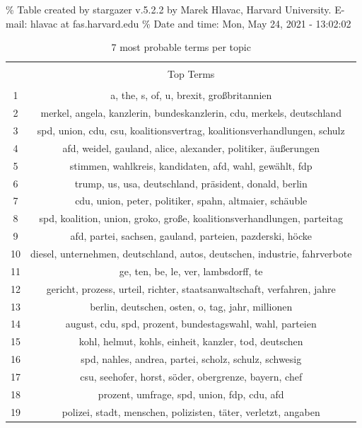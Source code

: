 \documentclass[
]{article}
\begin{document}
\% Table created by stargazer v.5.2.2 by Marek Hlavac, Harvard
University. E-mail: hlavac at fas.harvard.edu \% Date and time: Mon, May
24, 2021 - 13:02:02

\begin{table}[!htbp] \centering 
  \caption{7 most probable terms per topic} 
  \label{table:top_terms} 
\begin{tabular}{@{\extracolsep{5pt}} cc} 
\\[-1.8ex]\hline 
\hline \\[-1.8ex] 
 & Top Terms \\ 
\hline \\[-1.8ex] 
1 & a, the, s, of, u, brexit, großbritannien \\ 
2 & merkel, angela, kanzlerin, bundeskanzlerin, cdu, merkels, deutschland \\ 
3 & spd, union, cdu, csu, koalitionsvertrag, koalitionsverhandlungen, schulz \\ 
4 & afd, weidel, gauland, alice, alexander, politiker, äußerungen \\ 
5 & stimmen, wahlkreis, kandidaten, afd, wahl, gewählt, fdp \\ 
6 & trump, us, usa, deutschland, präsident, donald, berlin \\ 
7 & cdu, union, peter, politiker, spahn, altmaier, schäuble \\ 
8 & spd, koalition, union, groko, große, koalitionsverhandlungen, parteitag \\ 
9 & afd, partei, sachsen, gauland, parteien, pazderski, höcke \\ 
10 & diesel, unternehmen, deutschland, autos, deutschen, industrie, fahrverbote \\ 
11 & ge, ten, be, le, ver, lambsdorff, te \\ 
12 & gericht, prozess, urteil, richter, staatsanwaltschaft, verfahren, jahre \\ 
13 & berlin, deutschen, osten, o, tag, jahr, millionen \\ 
14 & august, cdu, spd, prozent, bundestagswahl, wahl, parteien \\ 
15 & kohl, helmut, kohls, einheit, kanzler, tod, deutschen \\ 
16 & spd, nahles, andrea, partei, scholz, schulz, schwesig \\ 
17 & csu, seehofer, horst, söder, obergrenze, bayern, chef \\ 
18 & prozent, umfrage, spd, union, fdp, cdu, afd \\ 
19 & polizei, stadt, menschen, polizisten, täter, verletzt, angaben \\ 

\end{tabular}
\end{table}
\end{document}
